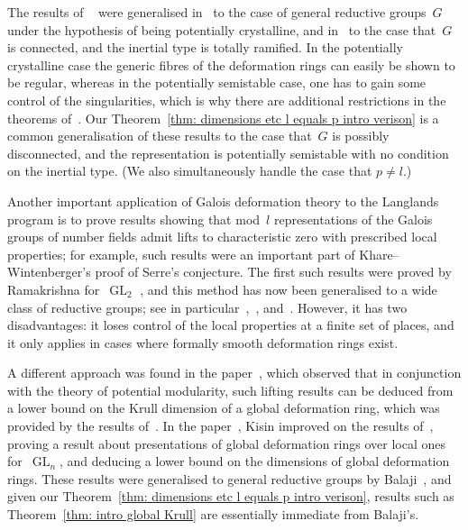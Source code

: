 \documentclass{amsart}
\theoremstyle{definition}
\theoremstyle{remark}
\DeclareMathOperator{\GL}{GL}
\begin{document}
The results of ~\cite{MR2373358} were generalised in~\cite{MR3152673}
to the case of general reductive groups~$G$ under the hypothesis of
being potentially crystalline, and in~\cite{2014arXiv1403.1411B} to
the case that~$G$ is connected, and the inertial type is totally
ramified. In the potentially crystalline case the generic fibres of
the deformation rings can easily be shown to be regular, whereas in the
potentially semistable case, one has to gain some control of the
singularities, which is why there are additional restrictions in the
theorems of~\cite{2014arXiv1403.1411B}. Our Theorem~\ref{thm:
  dimensions etc l equals p intro verison} is a common generalisation
of these results to the case that~$G$ is possibly disconnected, and
the representation is potentially semistable with no condition on the
inertial type. (We also simultaneously handle the case that $p\ne l$.)

Another important application of Galois deformation theory to the
Langlands program is to prove results showing that mod~$l$
representations of the Galois groups of number fields admit lifts to
characteristic zero with prescribed local properties; for example,
such results were an important part of Khare--Wintenberger's proof of
Serre's conjecture. The first such results were proved by Ramakrishna
for~$\GL_2$ \cite{MR1935843}, and this method has now been generalised to
a wide class of reductive groups; see in particular~\cite{MR3529115},~\cite{2016arXiv161204237B}, and~\cite{2018arXiv180710743B}. However, it has two disadvantages: it
loses control of the local properties at a finite set of places, and
it only applies in cases where formally smooth deformation rings exist.

A different approach was found in the paper~\cite{MR2480604}, which
observed that in conjunction with the theory of potential modularity,
such lifting results can be deduced from a lower bound on the Krull
dimension of a global deformation ring, which was provided by the
results of~\cite{MR1679172}. In the paper~\cite{MR2459302}, Kisin
improved on the results of~\cite{MR1679172}, proving a result about
presentations of global deformation rings over local ones for~$\GL_n$,
and deducing a lower bound on the dimensions of global deformation
rings. These results were generalised to general reductive groups by
Balaji~\cite{MR3152673}, and given our Theorem~\ref{thm: dimensions
  etc l equals p intro verison}, results such as Theorem~\ref{thm:
  intro global Krull} are essentially immediate from Balaji's.
\end{document}
